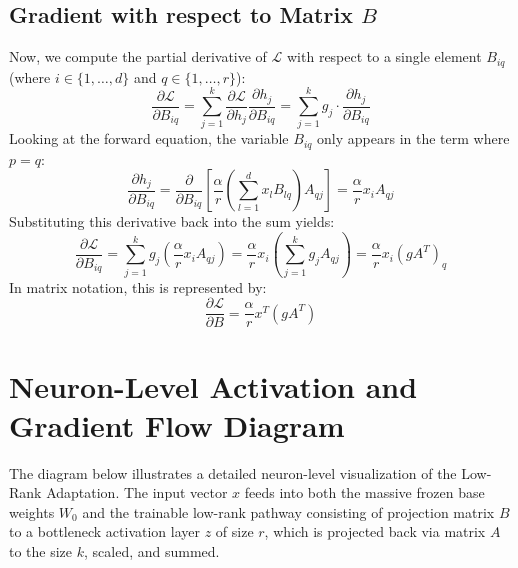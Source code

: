 \documentclass{article}
\begin{document}
\subsection{Gradient with respect to Matrix $B$}
Now, we compute the partial derivative of $\mathcal{L}$ with respect to a single element $B_{iq}$ (where $i \in \{1,\dots,d\}$ and $q \in \{1,\dots,r\}$):
\begin{equation}
    \frac{\partial \mathcal{L}}{\partial B_{iq}} = \sum_{j=1}^k \frac{\partial \mathcal{L}}{\partial h_j} \frac{\partial h_j}{\partial B_{iq}} = \sum_{j=1}^k g_j \cdot \frac{\partial h_j}{\partial B_{iq}}
\end{equation}
Looking at the forward equation, the variable $B_{iq}$ only appears in the term where $p = q$:
\begin{equation}
    \frac{\partial h_j}{\partial B_{iq}} = \frac{\partial}{\partial B_{iq}} \left[ \frac{\alpha}{r} \left( \sum_{l=1}^d x_l B_{lq} \right) A_{qj} \right] = \frac{\alpha}{r} x_i A_{qj}
\end{equation}
Substituting this derivative back into the sum yields:
\begin{equation}
    \frac{\partial \mathcal{L}}{\partial B_{iq}} = \sum_{j=1}^k g_j \left( \frac{\alpha}{r} x_i A_{qj} \right) = \frac{\alpha}{r} x_i \left( \sum_{j=1}^k g_j A_{qj} \right) = \frac{\alpha}{r} x_i (g A^T)_q
\end{equation}
In matrix notation, this is represented by:
\begin{equation}
    \frac{\partial \mathcal{L}}{\partial B} = \frac{\alpha}{r} x^T (g A^T)
\end{equation}

\newpage
\section{Neuron-Level Activation and Gradient Flow Diagram}
The diagram below illustrates a detailed neuron-level visualization of the Low-Rank Adaptation. The input vector $x$ feeds into both the massive frozen base weights $W_0$ and the trainable low-rank pathway consisting of projection matrix $B$ to a bottleneck activation layer $z$ of size $r$, which is projected back via matrix $A$ to the size $k$, scaled, and summed.
\end{document}
